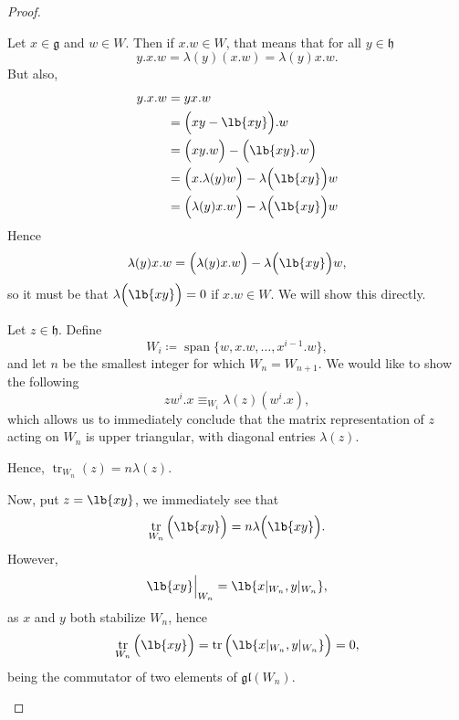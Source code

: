 \documentclass{article}
\DeclarePairedDelimiter\lb\lbrack\rbrack
\DeclareMathOperator{\tr}{tr}
\DeclareMathOperator{\opspan}{span}
\newcommand*\frkg{{\ensuremath{\mathfrak{g}}}}
\newcommand*\frkh{{\ensuremath{\mathfrak{h}}}}
\newcommand*\gl{\ensuremath{\mathfrak{gl}}}
\newcommand*\acts{.}
\begin{document}
\begin{proof}
\begin{itemize}
            Let $x \in \frkg$ and $w \in W$.
            Then if $x \acts w \in W$, that means that for all $y \in \frkh$
            \[
                y \acts x \acts w
                =
                \lambda(y)(x \acts w)
                =
                \lambda(y)x \acts w.
            \]
            But also,
            \begin{align*}
                y \acts x \acts w
                &=
                yx \acts w
                \\
                &=
                \Big(xy - \lb{xy}\Big) \acts w
                \\
                &=
                \Big(
                    xy \acts w
                \Big)
                -
                \Big(
                    \lb{xy} \acts w
                \Big)
                \\
                &=
                \Big(
                    x \acts \lambda(y)w
                \Big)
                -
                \lambda\Big(\lb{xy}\Big) w
                \\
                &=
                \Big(
                    \lambda(y)x \acts w
                \Big)
                -
                \lambda\Big(\lb{xy}\Big) w
            \end{align*}
            Hence
            \[
                \lambda(y)x \acts w
                =
                \Big(
                    \lambda(y)x \acts w
                \Big)
                - \lambda\Big(\lb{xy}\Big) w
                ,
            \]
            so it must be that $\lambda\Big(\lb{xy}\Big) = 0$ if $x \acts w \in W$.
            We will show this directly.

            Let $z \in \frkh$.
            Define
            \[
                W_i
                \coloneq
                \opspan\{w, x \acts w, \ldots, x^{i-1} \acts w\},
            \]
            and let $n$ be the smallest integer for which $W_n = W_{n+1}$.
            We would like to show the following
            \[
                zw^i \acts x
                \equiv_{W_i}
                \lambda(z)(w^i \acts x),
            \]
            which allows us to immediately conclude that the matrix representation of $z$ acting on $W_n$ is upper triangular, with diagonal entries $\lambda(z)$.

            Hence, $\tr_{W_n}(z) = n\lambda(z)$.

            Now, put $z = \lb{xy}$, we immediately see that
            \[
                \tr_{W_n}\Big(\lb{xy}\Big)
                =
                n\lambda\Big(\lb{xy}\Big).
            \]
            However,
            \[
                \lb{xy}\Big\rvert_{W_n}
                =
                \lb{
                    x \rvert_{W_n},
                    y \rvert_{W_n}
                },
            \]
            as $x$ and $y$ both stabilize $W_n$, hence
            \[
                \tr_{W_n}\Big(\lb{xy}\Big)
                =
                \tr\Big(\lb{
                    x \rvert_{W_n},
                    y \rvert_{W_n}
                }\Big)
                =
                0,
            \]
            being the commutator of two elements of $\gl(W_n)$.


\end{itemize}
\end{proof}
\end{document}
